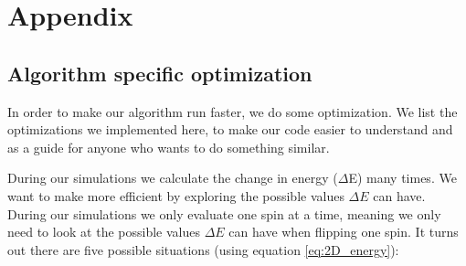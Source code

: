 \documentclass[reprint, english,notitlepage,nofootinbib]{revtex4-1}  %
\begin{document}
\section{Appendix}
\subsection{Algorithm specific optimization}

In order to make our algorithm run faster, we do some optimization. We list the optimizations we implemented here, to make our code easier to understand and as a guide for anyone who wants to do something similar.

During our simulations we calculate the change in energy ($\Delta$E) many times. We want to make more efficient by exploring the possible values $\Delta E$ can have. During our simulations we only evaluate one spin at a time, meaning we only need to look at the possible values $\Delta E$ can have when flipping one spin. It turns out there are five possible situations (using equation \eqref{eq:2D_energy}):
\end{document}
